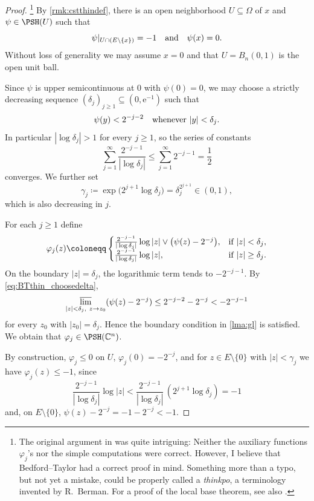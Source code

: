 \begin{proof}\footnote{The original argument in \cite[Proposition~10.2]{BT82} was quite intriguing: Neither the auxiliary functions $\varphi_j$'s nor the simple computations were correct. However, I believe that Bedford--Taylor had a correct proof in mind. Something more than a typo, but not yet a mistake, could be properly called a \emph{thinkpo}, a terminology invented by R.~Berman. For a proof of the local base theorem, see also \cite[Proposition~10.3.2]{FPT}.}
By \cref{rmk:cstthindef}, there is an open neighborhood $U\subseteq \Omega$ of $x$ and $\psi\in \PSH(U)$ such that
\[
    \psi|_{U\cap (E\setminus\{x\})}=-1 \quad\textup{and}\quad \psi(x)=0.
\]
Without loss of generality we may assume $x=0$ and that $U=B_n(0,1)$ is the open unit ball.

Since $\psi$ is upper semicontinuous at $0$ with $\psi(0)=0$, we may choose a strictly decreasing sequence $(\delta_j)_{j\geq 1}\subseteq (0,\mathrm{e}^{-1})$ such that
\begin{equation}\label{eq:BTthin_choosedelta}
    \psi(y)<2^{-j-2}\quad\textup{whenever } |y|<\delta_j.
\end{equation}
In particular $|\log\delta_j|>1$ for every $j\geq 1$, so the series of constants
\begin{equation}\label{eq:BTthin_summable}
    \sum_{j=1}^\infty \frac{2^{-j-1}}{|\log\delta_j|} \leq \sum_{j=1}^\infty 2^{-j-1}=\frac{1}{2}
\end{equation}
converges. We further set
\[
    \gamma_j\coloneqq \exp\bigl(2^{j+1}\log\delta_j\bigr)=\delta_j^{2^{j+1}}\in(0,1),
\]
which is also decreasing in $j$.

For each $j\geq 1$ define
\[
    \varphi_j(z)\coloneqq
    \begin{cases}
        \frac{2^{-j-1}}{|\log\delta_j|}\log|z|\lor\bigl(\psi(z)-2^{-j}\bigr), &\textup{if } |z|<\delta_j,\\
        \frac{2^{-j-1}}{|\log\delta_j|}\log|z|,&\textup{if } |z|\geq \delta_j.
    \end{cases}
\]
On the boundary $|z|=\delta_j$, the logarithmic term tends to $-2^{-j-1}$. By \eqref{eq:BTthin_choosedelta},
\[
    \varlimsup_{|z|<\delta_j,\ z\to z_0}(\psi(z)-2^{-j})\leq 2^{-j-2}-2^{-j}<-2^{-j-1}
\]
for every $z_0$ with $|z_0|=\delta_j$. Hence the boundary condition in \cref{lma:gl} is satisfied. We obtain that $\varphi_j\in \PSH(\mathbb{C}^n)$.

By construction, $\varphi_j\leq 0$ on $U$, $\varphi_j(0)=-2^{-j}$, and for $z\in E\setminus\{0\}$ with $|z|<\gamma_j$ we have $\varphi_j(z)\leq -1$, since
\[
    \frac{2^{-j-1}}{|\log\delta_j|}\log|z|<\frac{2^{-j-1}}{|\log\delta_j|}\,(2^{j+1}\log\delta_j)=-1
\]
and, on $E\setminus\{0\}$, $\psi(z)-2^{-j}=-1-2^{-j}<-1$.


\end{proof}
